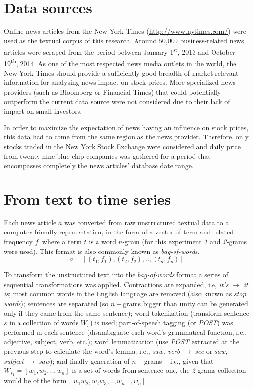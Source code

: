 \documentclass{article}
\begin{document}
\section{Data sources}
Online news articles from the New York Times (\url{http://www.nytimes.com/}) were used as the textual corpus of this research. Around 50,000 business-related news articles were scraped from the period between January 1\textsuperscript{st}, 2013 and October 19\textsuperscript{th}, 2014. As one of the most respected news media outlets in the world, the New York Times should provide a sufficiently good breadth of market relevant information for analysing news impact on stock prices. More specialized news providers (such as Bloomberg or Financial Times) that could potentially outperform the current data source were not considered due to their lack of impact on small investors.

\par
In order to maximize the expectation of news having an influence on stock prices, this data had to come from the same region as the news provider. Therefore, only stocks traded in the New York Stock Exchange were considered and daily price from twenty nine blue chip companies was gathered for a period that encompasses completely the news articles' database date range.

\section{From text to time series}
Each news article \(a\) was converted from raw unstructured textual data to a computer-friendly representation, in the form of a vector of term and related frequency \(f\), where a term \(t\) is a word \textit{n-}gram (for this experiment \textit{1} and \textit{2-}grams were used). This format is also commonly known as \textit{bag-of-words}.
\[a=[(t_1,f_1),(t_2,f_2),..,(t_n,f_n)]\]

\par
To transform the unstructured text into the \textit{bag-of-words} format a series of sequential transformations was applied. Contractions are expanded, i.e, \textit{it's} \(\to\) \textit{it is}; most common words in the English language are removed (also known as \textit{stop words}); sentences are separated (so \(n-\)grams bigger than unity can be generated only if they came from the same sentence); word tokenization (transform sentence \(s\) in a collection of words \(W_s\)) is used; part-of-speech tagging (or \textit{POST}) was performed in each sentence (disambiguate each word's grammatical function, i.e., adjective, subject, verb, etc.); word lemmatization (use \textit{POST} extracted at the previous step to calculate the word's lemma, i.e., \textit{saw, verb} \(\to\) \textit{see} or \textit{saw, subject} \(\to\) \textit{saw}); and finally generation of \(n-\)grams -- i.e., given that \(W_{s_1}=[w_1,w_2,..,w_n]\) is a set of words from sentence one, the \textit{2-}grams collection would be of the form \([w_1 w_2,w_2 w_3,..,w_{n-1} w_n]\).
\end{document}
